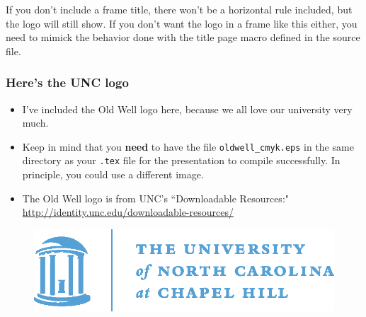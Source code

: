 \documentclass{beamer}
\begin{document}
%
\begin{frame}
If you don't include a frame title, there won't be a horizontal 
rule included, but the logo will still show. 
If you don't want the logo in a frame like this 
either, you need to mimick the behavior done with the 
title page macro defined in the source file.
\end{frame}
%
\begin{frame}
\frametitle{Here's the UNC logo}

\begin{itemize}
\item I've included the Old Well logo here, 
because we all love our university very much. 
\item Keep in mind 
that you \textbf{need} to have the file \texttt{oldwell\_cmyk.eps} 
in the same directory as your \texttt{.tex} file for the 
presentation to compile successfully. In principle, 
you could use a different image.
\item The Old Well logo is from 
UNC's ``Downloadable Resources:"
{\color{blue!80} \url{http://identity.unc.edu/downloadable-resources/}}
\end{itemize}

\begin{figure}
\centering
\includegraphics[width=0.6\linewidth]{oldwell_cmyk}
\end{figure}
\end{frame}
%
\end{document}
